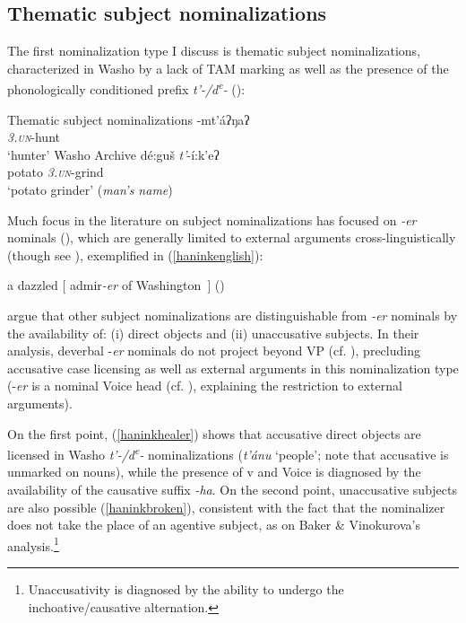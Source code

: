 \documentclass[output=paper]{langscibook}
\begin{document}
\subsection{Thematic subject nominalizations}

The first nominalization type I discuss is thematic subject nominalizations, characterized in Washo by a lack of TAM marking as well as the presence of the phonologically conditioned prefix {\itshape t'-/d\textsuperscript{e}-} (\citealt{jacobsen1964}):

\ea Thematic subject nominalizations
\ea {}-mt'áʔŋaʔ\\
\textit{\textsc{3.un}}-hunt\\
\glt `hunter' \hfill Washo Archive
\ex \gll dé:guš {\itshape t'}-í:k'eʔ\\
potato \textit{\textsc{3.un}}-grind\\
\glt `potato grinder' ({\itshape man's name}) \hfill \citep[354]{jacobsen1964}
\z
\z

\begin{sloppypar}
Much focus in the literature on subject nominalizations has focused on {\itshape -er} nominals (\citealt{rappaporthovavlevin1992,bakervinokurova2009,alexiadouschafer2010}), which are generally limited to external arguments cross-lin\-guis\-ti\-cal\-ly (though see \citealt{alexiadouschafer2008,alexiadouschafer2010}), exemplified in (\ref{haninkenglish}):
\end{sloppypar}

\ea a dazzled $[$ admir{\itshape -er} of Washington\ $]$  \hfill (\citealt{rappaporthovavlevin1992})\label{haninkenglish}
\z 



\noindent\citet{bakervinokurova2009} argue that other subject nominalizations are distinguishable from {\itshape -er} nominals by the availability of: (i) direct objects and (ii) unaccusative subjects. In their analysis, deverbal -{\itshape er} nominals do not project beyond VP (cf. \citealt{alexiadouschafer2010}), precluding accusative case licensing as well as external arguments in this nominalization type  (-{\itshape er} is a nominal Voice head (cf. \citealt{kratzer1996}), explaining the restriction to external arguments). 

On the first point, (\ref{haninkhealer}) shows that accusative direct objects are licensed in Washo  {\itshape t'-/d\textsuperscript{e}-} nominalizations ({\itshape t'ánu} `people'; note that accusative is unmarked on nouns), while the presence of v and Voice is diagnosed by the availability of the causative suffix {\itshape -ha}. On the second point, unaccusative subjects are also possible (\ref{haninkbroken}), consistent with the fact that the nominalizer does not take the place of an agentive subject, as on Baker \& Vinokurova's \citeyear{bakervinokurova2009} analysis.\footnote{Unaccusativity is diagnosed by the ability to undergo the inchoative/causative alternation.}
\end{document}
